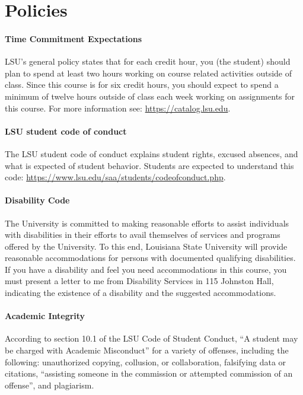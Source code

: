 \documentclass[11pt,article,oneside]{memoir}
\begin{document}

\section{Policies}

\paragraph{Time Commitment Expectations}
LSU's general policy states that for each credit hour, 
you (the student) should plan to
spend at least two hours working 
on course related activities outside of class. 
Since this course is for six credit hours, 
you should expect to spend a minimum of twelve hours 
outside of class each week 
working on assignments for this course. 
For more information see: 
\url{https://catalog.lsu.edu}.

\paragraph{LSU student code of conduct}
The LSU student code of conduct explains 
student rights, excused absences, 
and what is expected of student behavior. 
Students are expected to understand this code:  
\url{https://www.lsu.edu/saa/students/codeofconduct.php}.

\paragraph{Disability Code}
The University is committed to making reasonable efforts 
to assist individuals with disabilities in
their efforts to avail themselves of 
services and programs offered by the University. 
To this end, Louisiana State University will provide 
reasonable accommodations for persons
with documented qualifying disabilities.
If you have a disability and 
feel you need accommodations in this course, 
you must present a letter to me 
from Disability Services in 115 Johnston Hall,
indicating the existence of a disability 
and the suggested accommodations.

\paragraph{Academic Integrity}
According to section 10.1 
of the LSU Code of Student Conduct, 
``A student may be charged with Academic Misconduct'' 
for a variety of offenses, including the following: 
unauthorized copying, collusion, or collaboration,
falsifying data or citations,
``assisting someone in the commission 
or attempted commission of an offense'',
and plagiarism.
\end{document}
